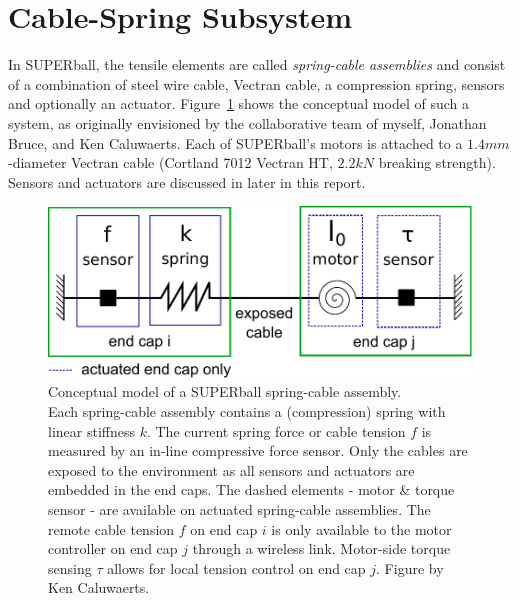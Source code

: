 \documentclass[12pt]{report}
\begin{document}

\section{Cable-Spring Subsystem}

In SUPERball, the tensile elements are called \emph{spring-cable assemblies} and consist of a combination of steel wire cable, Vectran cable, a compression spring, sensors and optionally an actuator.
Figure~\ref{fig:springcable} shows the conceptual model of such a system, as originally envisioned by the collaborative team of myself, Jonathan Bruce, and Ken Caluwaerts.
Each of SUPERball's motors is attached to a $1.4mm$-diameter Vectran cable (Cortland 7012 Vectran HT, $2.2kN$ breaking strength).
Sensors and actuators are discussed in later in this report.

\begin{figure}[thpb]
      \centering
      \includegraphics[width=.55\columnwidth]{img/spring_assembly.pdf}
      \caption{Conceptual model of a SUPERball spring-cable assembly. \\
Each spring-cable assembly contains a (compression) spring with linear stiffness $k$. 
The current spring force or cable tension $f$ is measured by an in-line compressive force sensor.
Only the cables are exposed to the environment as all sensors and actuators are embedded in the end caps. 
The dashed elements - motor \& torque sensor - are available on actuated spring-cable assemblies.
The remote cable tension $f$ on end cap $i$ is only available to the motor controller on end cap $j$ through a wireless link.
Motor-side torque sensing $\tau$ allows for local tension control on end cap $j$.
Figure by Ken Caluwaerts.~\cite{sabelhaus2015system}
}
      \label{fig:springcable}
\end{figure}
\end{document}
